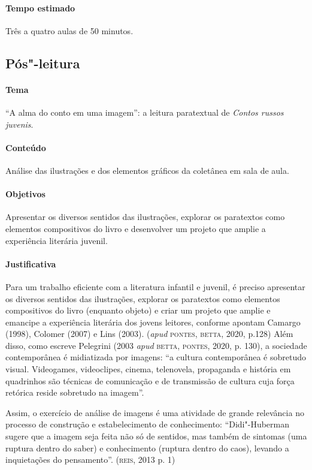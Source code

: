 \documentclass[11pt]{extarticle}
\begin{document}
\paragraph{Tempo estimado} Três a quatro aulas de 50 minutos.

\subsection{Pós"-leitura}


\paragraph{Tema} ``A alma do conto em uma imagem'': a leitura paratextual de \emph{Contos russos juvenis}.


\paragraph{Conteúdo}
Análise das ilustrações e dos elementos gráficos da coletânea em sala de aula.

\paragraph{Objetivos}
Apresentar os diversos sentidos das ilustrações, explorar os paratextos
como elementos compositivos do livro e desenvolver um projeto que amplie
a experiência literária juvenil.

\paragraph{Justificativa}
Para um trabalho eficiente com a literatura infantil e juvenil, é
preciso apresentar os diversos sentidos das ilustrações, explorar os
paratextos como elementos compositivos do livro (enquanto objeto) e criar um
projeto que amplie e emancipe a experiência literária dos jovens
leitores, conforme apontam Camargo (1998), Colomer (2007) e Lins (2003).
(\emph{apud} \textsc{pontes}, \textsc{betta}, 2020, p.128) Além disso, como escreve
Pelegrini (2003 \emph{apud} \textsc{betta}, \textsc{pontes}, 2020, p. 130), a sociedade
contemporânea é midiatizada por imagens: ``a cultura contemporânea é
sobretudo visual. Videogames, videoclipes, cinema, telenovela,
propaganda e história em quadrinhos são técnicas de comunicação e de
transmissão de cultura cuja força retórica reside sobretudo na imagem''.

Assim, o exercício de análise de imagens é uma atividade de grande
relevância no processo de construção e estabelecimento de conhecimento:
``Didi"-Huberman sugere que a imagem seja feita não só de sentidos, mas
também de sintomas (uma ruptura dentro do saber) e conhecimento (ruptura
dentro do caos), levando a inquietações do pensamento''. (\textsc{reis}, 2013 p. 1)
\end{document}
